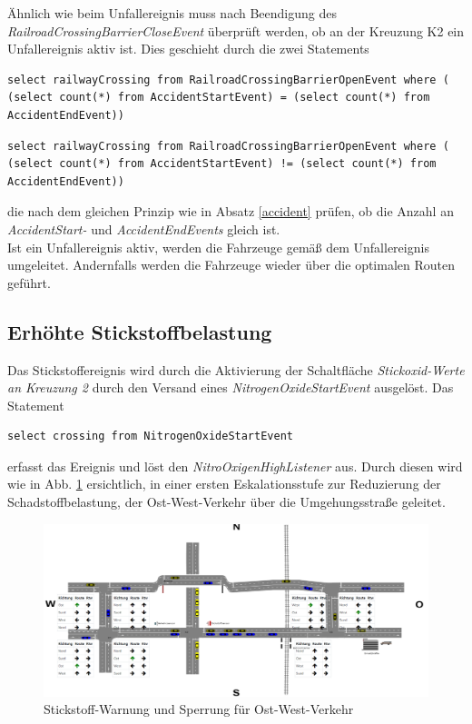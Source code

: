Ähnlich wie beim Unfallereignis muss nach Beendigung des \textit{RailroadCrossingBarrierCloseEvent} überprüft werden, ob an der Kreuzung K2 ein Unfallereignis aktiv ist. Dies geschieht durch die zwei Statements 

\begin{lstlisting}
select railwayCrossing from RailroadCrossingBarrierOpenEvent where ( (select count(*) from AccidentStartEvent) = (select count(*) from AccidentEndEvent))
\end{lstlisting}

\begin{lstlisting}
select railwayCrossing from RailroadCrossingBarrierOpenEvent where ( (select count(*) from AccidentStartEvent) != (select count(*) from AccidentEndEvent))
\end{lstlisting}

die nach dem gleichen Prinzip wie in Absatz \ref{accident} prüfen, ob die Anzahl an \textit{AccidentStart-} und \textit{AccidentEndEvents} gleich ist.\\
Ist ein Unfallereignis aktiv, werden die Fahrzeuge gemäß dem Unfallereignis umgeleitet. Andernfalls werden die Fahrzeuge wieder über die optimalen Routen geführt.




\subsection{Erhöhte Stickstoffbelastung}

Das Stickstoffereignis wird durch die Aktivierung der Schaltfläche \textit{Stickoxid-Werte an Kreuzung 2} durch den Versand eines \textit{NitrogenOxideStartEvent} ausgelöst. Das Statement

\begin{lstlisting}
select crossing from NitrogenOxideStartEvent
\end{lstlisting}

erfasst das Ereignis und löst den \textit{NitroOxigenHighListener} aus. Durch diesen wird wie in Abb. \ref{fig8} ersichtlich, in einer ersten Eskalationsstufe zur Reduzierung der Schadstoffbelastung, der Ost-West-Verkehr über die Umgehungsstraße geleitet. 

\begin{figure}[ht]
	\includegraphics[width=\textwidth]{images/NitroOxigenHigh.png}
	\caption{Stickstoff-Warnung und Sperrung für Ost-West-Verkehr}
	\label{fig8}
\end{figure}

